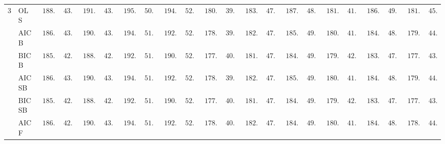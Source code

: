 \begin{tabular}{p{0.2cm}p{1cm}|p{0.6cm}p{0.6cm}|p{0.6cm}p{0.6cm}p{0.6cm}p{0.6cm}p{0.6cm}p{0.6cm}|p{0.6cm}p{0.6cm}p{0.6cm}p{0.6cm}p{0.6cm}p{0.6cm}|p{0.6cm}p{0.6cm}p{0.6cm}p{0.6cm}p{0.6cm}p{0.6cm}}
3 & OLS  & $\phantom{0}188.43$ & $\phantom{0}43.24$ & $\phantom{0}191.74$ & $\phantom{0}43.63$ & $\phantom{0}195.38$ & $\phantom{0}50.87$ & $\phantom{0}194.36$ & $\phantom{0}52.23$ & $\phantom{0}180.64$ & $\phantom{0}39.63$ & $\phantom{0}183.76$ & $\phantom{0}47.66$ & $\phantom{0}187.32$ & $\phantom{0}48.15$ & $\phantom{0}181.68$ & $\phantom{0}41.70$ & $\phantom{0}186.22$ & $\phantom{0}49.04$ & $\phantom{0}181.74$ & $\phantom{0}45.58$ \\
 & AIC B  & $\phantom{0}186.50$ & $\phantom{0}43.45$ & $\phantom{0}190.96$ & $\phantom{0}43.48$ & $\phantom{0}194.56$ & $\phantom{0}51.44$ & $\phantom{0}192.46$ & $\phantom{0}52.15$ & $\phantom{0}178.73$ & $\phantom{0}39.87$ & $\phantom{0}182.87$ & $\phantom{0}47.08$ & $\phantom{0}185.88$ & $\phantom{0}49.27$ & $\phantom{0}180.33$ & $\phantom{0}41.27$ & $\phantom{0}184.47$ & $\phantom{0}48.25$ & $\phantom{0}179.25$ & $\phantom{0}44.80$ \\
 & BIC B  & $\phantom{0}185.66$ & $\phantom{0}42.12$ & $\phantom{0}188.93$ & $\phantom{0}42.90$ & $\phantom{0}192.21$ & $\phantom{0}51.68$ & $\phantom{0}190.72$ & $\phantom{0}52.36$ & $\phantom{0}177.73$ & $\phantom{0}40.44$ & $\phantom{0}181.47$ & $\phantom{0}47.70$ & $\phantom{0}184.71$ & $\phantom{0}49.44$ & $\phantom{0}179.86$ & $\phantom{0}42.37$ & $\phantom{0}183.95$ & $\phantom{0}47.62$ & $\phantom{0}177.51$ & $\phantom{0}43.72$ \\
 & AIC SB  & $\phantom{0}186.50$ & $\phantom{0}43.45$ & $\phantom{0}190.96$ & $\phantom{0}43.48$ & $\phantom{0}194.56$ & $\phantom{0}51.44$ & $\phantom{0}192.46$ & $\phantom{0}52.15$ & $\phantom{0}178.73$ & $\phantom{0}39.87$ & $\phantom{0}182.85$ & $\phantom{0}47.07$ & $\phantom{0}185.88$ & $\phantom{0}49.27$ & $\phantom{0}180.33$ & $\phantom{0}41.27$ & $\phantom{0}184.47$ & $\phantom{0}48.25$ & $\phantom{0}179.25$ & $\phantom{0}44.80$ \\
 & BIC SB  & $\phantom{0}185.66$ & $\phantom{0}42.12$ & $\phantom{0}188.93$ & $\phantom{0}42.90$ & $\phantom{0}192.21$ & $\phantom{0}51.68$ & $\phantom{0}190.72$ & $\phantom{0}52.36$ & $\phantom{0}177.73$ & $\phantom{0}40.44$ & $\phantom{0}181.47$ & $\phantom{0}47.70$ & $\phantom{0}184.58$ & $\phantom{0}49.42$ & $\phantom{0}179.87$ & $\phantom{0}42.35$ & $\phantom{0}183.95$ & $\phantom{0}47.62$ & $\phantom{0}177.51$ & $\phantom{0}43.72$ \\
 & AIC F  & $\phantom{0}186.31$ & $\phantom{0}42.89$ & $\phantom{0}190.75$ & $\phantom{0}43.32$ & $\phantom{0}194.40$ & $\phantom{0}51.64$ & $\phantom{0}192.09$ & $\phantom{0}52.27$ & $\phantom{0}178.65$ & $\phantom{0}40.04$ & $\phantom{0}182.41$ & $\phantom{0}47.39$ & $\phantom{0}184.54$ & $\phantom{0}49.44$ & $\phantom{0}180.34$ & $\phantom{0}41.30$ & $\phantom{0}184.19$ & $\phantom{0}48.00$ & $\phantom{0}178.54$ & $\phantom{0}44.71$ \\

\end{tabular}
